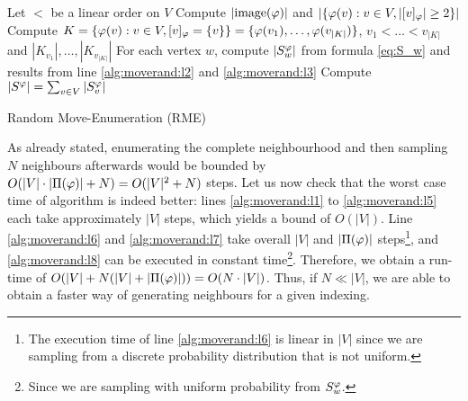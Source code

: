 \begin{algorithm}[ht]
    \SetAlgoLined
    \DontPrintSemicolon
    Let $<$ be a linear order on $V$ \label{alg:moverand:l1} \;
    Compute $|\mathrm{image}(\varphi)|$ and $|\{ \varphi(v) : v\in V, |[v]_\varphi| \geq 2 \}|$ \label{alg:moverand:l2} \;
    Compute $K = \{ \varphi(v) : v \in V, [v]_\varphi = \{v\}\} = \{ \varphi(v_1),\dots,\varphi(v_{|K|}) \}$, $v_1 < \dots < v_{|K|}$ and $|K_{v_1}|,\dots,|K_{v_{|K|}}|$ \label{alg:moverand:l3} \;
    For each vertex $w$, compute $|S^\varphi_w|$ from formula \eqref{eq:S_w} and results from line \ref{alg:moverand:l2} and \ref{alg:moverand:l3} \label{alg:moverand:l4} \;
    Compute $|S^\varphi| = \sum_{v \in V} |S^\varphi_v|$ \label{alg:moverand:l5} \;
    \caption{Random Move-Enumeration (RME)} \label{alg:moverand}
\end{algorithm}

As already stated, enumerating the complete neighbourhood and then sampling $N$ neighbours afterwards would be bounded by $O(|V|\cdot|\Pi(\varphi)|+ N) = O(|V|^2+N)$ steps. Let us now check that the worst case time of algorithm \emph{} is indeed better: lines \ref{alg:moverand:l1} to \ref{alg:moverand:l5} each take approximately $|V|$ steps, which yields a bound of $O(|V|)$. Line \ref{alg:moverand:l6} and \ref{alg:moverand:l7} take overall $|V|$ and $|\Pi(\varphi)|$ steps\footnote{The execution time of line \ref{alg:moverand:l6} is linear in $|V|$ since we are sampling from a discrete probability distribution that is not uniform.}, and \ref{alg:moverand:l8} can be executed in constant time\footnote{Since we are sampling with uniform probability from $S^\varphi_w$.}. Therefore, we obtain a run-time of $O(|V| + N(|V| + |\Pi(\varphi)|)) = O(N\cdot |V|)$. Thus, if $N \ll |V|$, we are able to obtain a faster way of generating neighbours for a given indexing.
